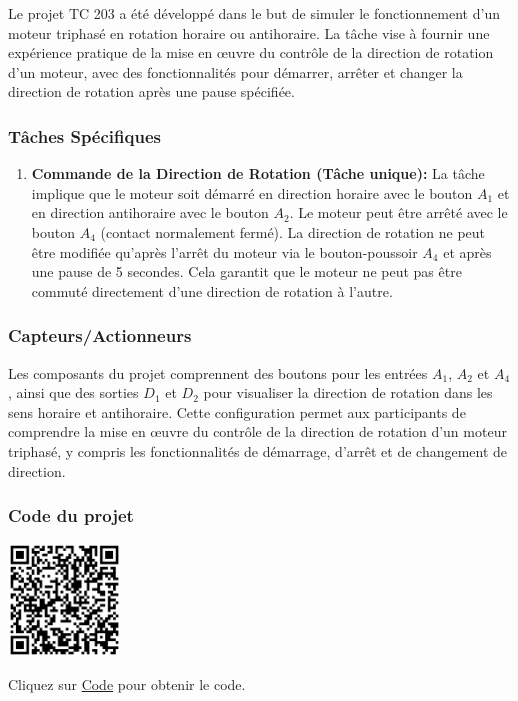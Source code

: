 \documentclass[a4paper,12pt]{report}
\begin{document}
Le projet TC 203 a été développé dans le but de simuler le fonctionnement d'un moteur triphasé en rotation horaire ou antihoraire. La tâche vise à fournir une expérience pratique de la mise en œuvre du contrôle de la direction de rotation d'un moteur, avec des fonctionnalités pour démarrer, arrêter et changer la direction de rotation après une pause spécifiée.

\subsubsection{Tâches Spécifiques}

\begin{enumerate}
    \item \textbf{Commande de la Direction de Rotation (Tâche unique):} La tâche implique que le moteur soit démarré en direction horaire avec le bouton \(A_1\) et en direction antihoraire avec le bouton \(A_2\). Le moteur peut être arrêté avec le bouton \(A_4\) (contact normalement fermé). La direction de rotation ne peut être modifiée qu'après l'arrêt du moteur via le bouton-poussoir \(A_4\) et après une pause de 5 secondes. Cela garantit que le moteur ne peut pas être commuté directement d'une direction de rotation à l'autre.
\end{enumerate}

\subsubsection{Capteurs/Actionneurs}

Les composants du projet comprennent des boutons pour les entrées \(A_1\), \(A_2\) et \(A_4\), ainsi que des sorties \(D_1\) et \(D_2\) pour visualiser la direction de rotation dans les sens horaire et antihoraire. Cette configuration permet aux participants de comprendre la mise en œuvre du contrôle de la direction de rotation d'un moteur triphasé, y compris les fonctionnalités de démarrage, d'arrêt et de changement de direction.

\subsubsection{Code du projet}

\begin{minipage}{0.5\textwidth}
    \includegraphics[height=3cm]{Code TC203.png}
\end{minipage}%
\begin{minipage}{0.5\textwidth}
    Cliquez sur \href{https://github.com/DexterTaha/Controllino-PLC-Sample/blob/main/TC200/TC203_Sens_de_rotation/TC203_Sens_de_rotation.ino}{Code} pour obtenir le code.
\end{minipage}
\end{document}

